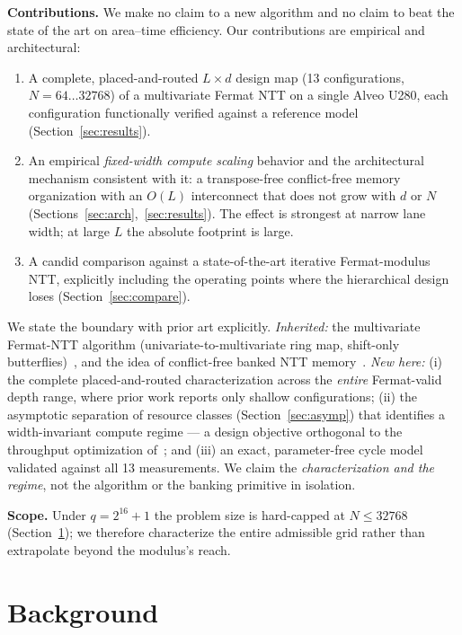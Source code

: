 \documentclass[conference]{IEEEtran}
\begin{document}
\textbf{Contributions.} We make no claim to a new algorithm and no claim to beat
the state of the art on area--time efficiency. Our contributions are empirical
and architectural:
\begin{enumerate}
  \item A complete, placed-and-routed $L\times d$ design map (13 configurations,
  $N=64\ldots32768$) of a multivariate Fermat NTT on a single Alveo U280, each
  configuration functionally verified against a reference model
  (Section~\ref{sec:results}).
  \item An empirical \emph{fixed-width compute scaling} behavior and the
  architectural mechanism consistent with it: a transpose-free conflict-free
  memory organization with an $O(L)$ interconnect that does not grow with $d$ or
  $N$ (Sections~\ref{sec:arch},~\ref{sec:results}). The effect is strongest at
  narrow lane width; at large $L$ the absolute footprint is large.
  \item A candid comparison against a state-of-the-art iterative Fermat-modulus
  NTT, explicitly including the operating points where the hierarchical design
  loses (Section~\ref{sec:compare}).
\end{enumerate}
We state the boundary with prior art explicitly. \emph{Inherited:} the
multivariate Fermat-NTT algorithm (univariate-to-multivariate ring map, shift-only
butterflies)~\cite{kim2024fermat,xing2025}, and the idea of conflict-free banked
NTT memory~\cite{wanggao2023}. \emph{New here:} (i) the complete placed-and-routed
characterization across the \emph{entire} Fermat-valid depth range, where prior
work reports only shallow configurations; (ii) the asymptotic separation of
resource classes (Section~\ref{sec:asymp}) that identifies a width-invariant
compute regime --- a design objective orthogonal to the throughput optimization
of~\cite{xing2025}; and (iii) an exact, parameter-free cycle model validated
against all 13 measurements. We claim the \emph{characterization and the regime},
not the algorithm or the banking primitive in isolation.

\textbf{Scope.} Under $q=2^{16}+1$ the problem size is hard-capped at
$N\le 32768$ (Section~\ref{sec:bg}); we therefore characterize the entire
admissible grid rather than extrapolate beyond the modulus's reach.

\section{Background}\label{sec:bg}
\end{document}
